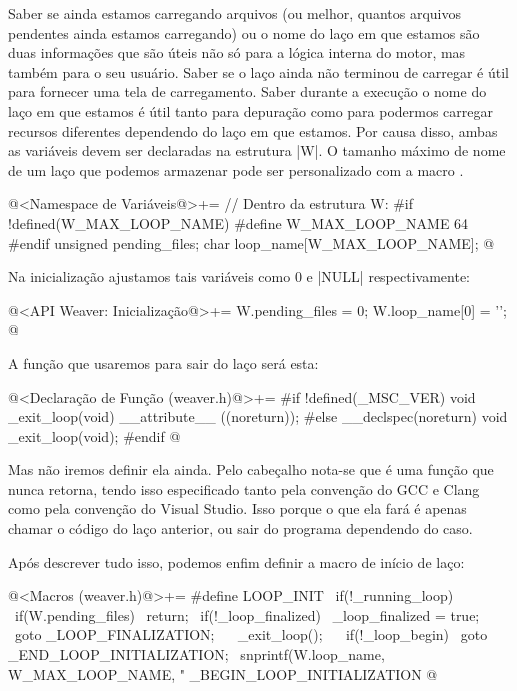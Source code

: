 Saber se ainda estamos carregando arquivos (ou melhor, quantos
arquivos pendentes ainda estamos carregando) ou o nome do laço em que
estamos são duas informações que são úteis não só para a lógica
interna do motor, mas também para o seu usuário. Saber se o laço ainda
não terminou de carregar é útil para fornecer uma tela de
carregamento. Saber durante a execução o nome do laço em que estamos é
útil tanto para depuração como para podermos carregar recursos
diferentes dependendo do laço em que estamos. Por causa disso, ambas
as variáveis devem ser declaradas na estrutura |W|. O tamanho máximo
de nome de um laço que podemos armazenar pode ser personalizado com a
macro .

\iniciocodigo
@<Namespace de Variáveis@>+=
// Dentro da estrutura W:
#if !defined(W_MAX_LOOP_NAME)
#define W_MAX_LOOP_NAME 64
#endif
unsigned pending_files;
char loop_name[W_MAX_LOOP_NAME];
@
\fimcodigo

Na inicialização ajustamos tais variáveis como 0 e |NULL|
respectivamente:

\iniciocodigo
@<API Weaver: Inicialização@>+=
W.pending_files = 0;
W.loop_name[0] = '\0';
@
\fimcodigo

A função que usaremos para sair do laço será esta:

\iniciocodigo
@<Declaração de Função (weaver.h)@>+=
#if !defined(_MSC_VER)
void _exit_loop(void) __attribute__ ((noreturn));
#else
__declspec(noreturn) void _exit_loop(void);
#endif
@
\fimcodigo

Mas não iremos definir ela ainda. Pelo cabeçalho nota-se que é uma
função que nunca retorna, tendo isso especificado tanto pela convenção
do GCC e Clang como pela convenção do Visual Studio. Isso porque o que
ela fará é apenas chamar o código do laço anterior, ou sair do
programa dependendo do caso.

Após descrever tudo isso, podemos enfim definir a macro de início de
laço:

\iniciocodigo
@<Macros (weaver.h)@>+=
#define LOOP_INIT                                                   \
  if(!_running_loop){                                               \
    if(W.pending_files)                                             \
      return;                                                       \
    if(!_loop_finalized){                                           \
      _loop_finalized = true;                                       \
      goto _LOOP_FINALIZATION;                                      \
    }                                                              \
    _exit_loop();                                                   \
  }                                                                 \
  if(!_loop_begin)                                                   \
    goto _END_LOOP_INITIALIZATION;                                   \
  snprintf(W.loop_name, W_MAX_LOOP_NAME, "%
  _BEGIN_LOOP_INITIALIZATION
@
\fimcodigo

